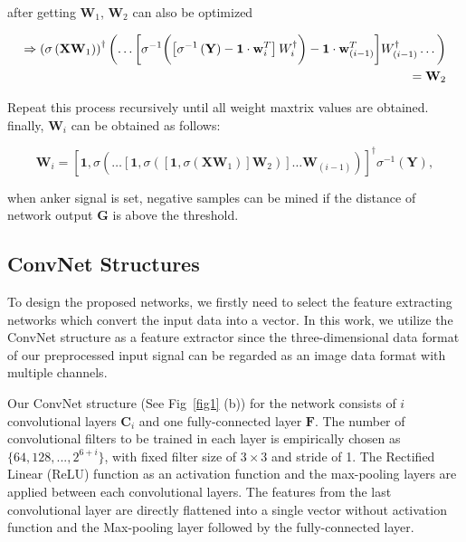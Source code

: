 \documentclass[runningheads]{llncs}
\begin{document}
after getting $\mathbf{W}_{1}$, $\mathbf{W}_{2}$ can also be optimized

\begin{equation}
\begin{aligned}
\Rightarrow
\left(\sigma\left(\mathbf{X}\mathbf{W}_{1}\right)\right)^{\dagger}
\biggl(\dots
\biggl[\sigma^{-1}\biggl(
    \left[\sigma^{-1}\left(\mathbf{Y}\right)-\mathbf{1}\cdot\mathbf{w}_{i}^{T}\right]\mathnormal{W}_{i}^\dagger
\biggr)
- \mathbf{1}\cdot\mathbf{w}_{(i-1)}^{T}\biggr]\mathnormal{W}_{(i-1)}^{\dagger}
\dots\biggr)\\
= \mathbf{W}_{2}
\end{aligned}
\end{equation}

Repeat this process recursively until all weight maxtrix values are obtained.
finally, $\mathbf{W}_{i}$ can be obtained as follows:

\begin{equation}
    \mathbf{W}_{i} = \left[\mathbf{1},\sigma\left(\dots\left[\mathbf{1},\sigma\left(\left[\mathbf{1},\sigma\left(\mathbf{X}\mathbf{W}_{1}\right)\right]\mathbf{W}_{2}\right)\right]\dots\mathbf{W}_{(i-1)}\right)\right]^{\dagger}\sigma^{-1}\left(\mathbf{Y}\right),
\end{equation}

when anker signal is set, negative samples can be mined if the distance of network output $\mathbf{G}$ is above the threshold.

\subsection{ConvNet Structures}

To design the proposed networks, we firstly need to select the feature extracting networks which convert the input data into a vector. In this work, we utilize the ConvNet structure \cite{lecun1998gradient} as a feature extractor since the three-dimensional data format of our preprocessed input signal can be regarded as an image data format with multiple channels. 

Our ConvNet structure (See Fig~\ref{fig1} (b)) for the network consists of $i$ convolutional layers $\mathbf{C}_{i}$ and one fully-connected layer $\mathbf{F}$. The number of convolutional filters to be trained in each layer is empirically chosen as $\{64, 128, ...,  2^{6+i}\}$, with fixed filter size of $3\times3$ and stride of 1. The Rectiﬁed Linear (ReLU) function as an activation function and the max-pooling layers are applied between each convolutional layers. The features from the last convolutional layer are directly flattened into a single vector without activation function and the Max-pooling layer followed by the fully-connected layer.
\end{document}
